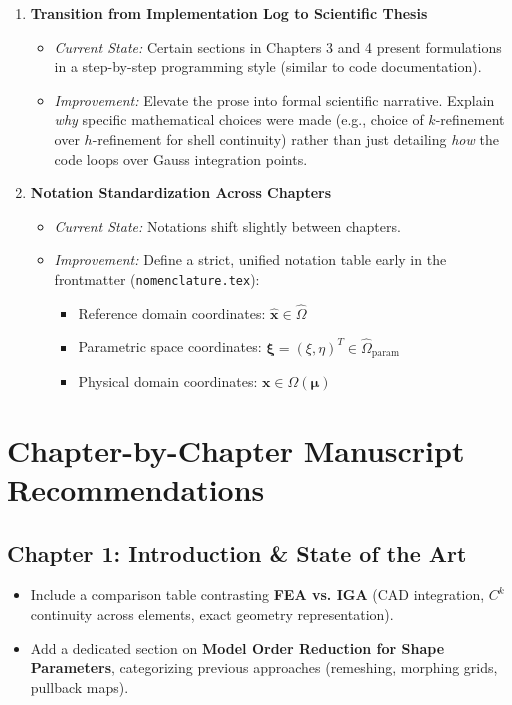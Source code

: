 \documentclass[12pt,a4paper]{article}
\newcommand{\vect}[1]{\mathbf{#1}}
\begin{document}
\begin{enumerate}[label=\textbf{Item 2.\arabic*:}, leftmargin=*]
    \item \textbf{Transition from Implementation Log to Scientific Thesis}
    \begin{itemize}
        \item \textit{Current State:} Certain sections in Chapters 3 and 4 present formulations in a step-by-step programming style (similar to code documentation).
        \item \textit{Improvement:} Elevate the prose into formal scientific narrative. Explain \textit{why} specific mathematical choices were made (e.g., choice of $k$-refinement over $h$-refinement for shell continuity) rather than just detailing \textit{how} the code loops over Gauss integration points.
    \end{itemize}

    \item \textbf{Notation Standardization Across Chapters}
    \begin{itemize}
        \item \textit{Current State:} Notations shift slightly between chapters.
        \item \textit{Improvement:} Define a strict, unified notation table early in the frontmatter (\texttt{nomenclature.tex}):
        \begin{itemize}
            \item Reference domain coordinates: $\hat{\vect{x}} \in \hat{\Omega}$
            \item Parametric space coordinates: $\boldsymbol{\xi} = (\xi, \eta)^T \in \hat{\Omega}_{\text{param}}$
            \item Physical domain coordinates: $\vect{x} \in \Omega(\boldsymbol{\mu})$
        \end{itemize}
    \end{itemize}
\end{enumerate}

\section{Chapter-by-Chapter Manuscript Recommendations}

\subsection*{Chapter 1: Introduction \& State of the Art}
\begin{itemize}
    \item Include a comparison table contrasting \textbf{FEA vs. IGA} (CAD integration, $C^{k}$ continuity across elements, exact geometry representation).
    \item Add a dedicated section on \textbf{Model Order Reduction for Shape Parameters}, categorizing previous approaches (remeshing, morphing grids, pullback maps).
\end{itemize}
\end{document}
